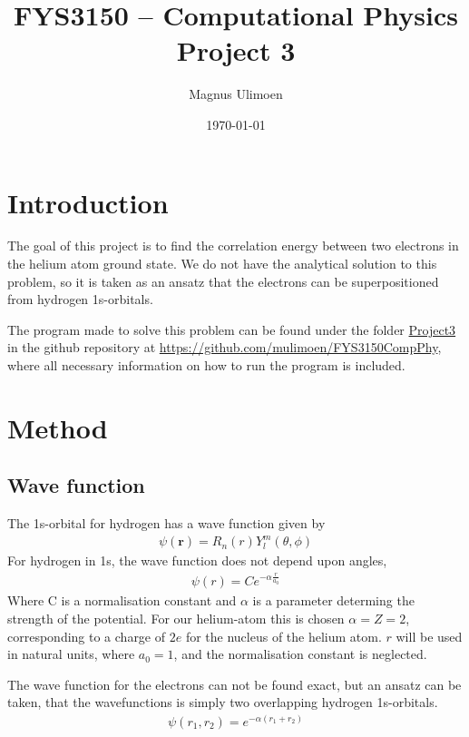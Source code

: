 \documentclass[11pt,a4paper,english,final]{article}
\title{FYS3150 -- Computational Physics\\Project 3}
\author{Magnus Ulimoen}
\date{\today}
\numberwithin{equation}{section}
\newcommand{\ve}[1]{\mathbf{#1}} %
\begin{document}
\maketitle


\section{Introduction}
\label{sec:intro}

The goal of this project is to find the correlation energy between two 
electrons in the helium atom ground state. We do not have the analytical 
solution to this problem, so it is taken as an ansatz that the electrons 
can be superpositioned from hydrogen 1s-orbitals.

The program made to solve this problem 
can be found under the folder \url{Project3} in the github 
repository at \url{https://github.com/mulimoen/FYS3150CompPhy}, 
where all necessary information on how to run the program is included.

\section{Method}

\subsection{Wave function}

The 1s-orbital for hydrogen has a wave function given by
\begin{gather}
\psi(\ve{r}) = R_n(r)Y_l^m(\theta, \phi)
\end{gather}
For hydrogen in 1s, the wave function does not depend upon angles,
\begin{gather}
\psi(r) = C e^{-\alpha \frac{r}{a_0}}
\end{gather}
Where C is a normalisation constant and $\alpha$ is a parameter 
determing the strength of the potential. 
For our helium-atom this is chosen $\alpha = Z = 2$, corresponding to 
a charge of $2e$ for the nucleus of the helium atom. 
$r$ will be used in natural units, 
where $a_0 = 1$, and the normalisation constant is neglected.

The wave function for the electrons can not be found exact, but an 
ansatz can be taken, that the wavefunctions is simply two overlapping 
hydrogen 1s-orbitals.
\begin{gather}
\psi(r_1, r_2) = e^{-\alpha(r_1 + r_2)}
\end{gather}
\end{document}
